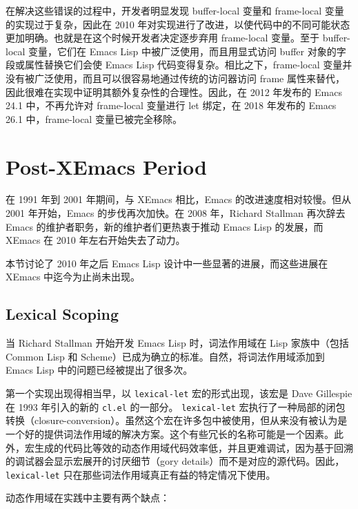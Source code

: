 \documentclass[format=acmsmall,screen]{acmart}
\begin{document}
在解决这些错误的过程中，开发者明显发现 buffer-local 变量和 frame-local 变量的实现过于复杂，因此在 2010 年对实现进行了改进，以使代码中的不同可能状态更加明确。也就是在这个时候开发者决定逐步弃用 frame-local 变量。至于 buffer-local 变量，它们在 Emacs Lisp 中被广泛使用，而且用显式访问 buffer 对象的字段或属性替换它们会使 Emacs Lisp 代码变得复杂。相比之下，frame-local 变量并没有被广泛使用，而且可以很容易地通过传统的访问器访问 frame 属性来替代，因此很难在实现中证明其额外复杂性的合理性。因此，在 2012 年发布的 Emacs 24.1 中，不再允许对 frame-local 变量进行 let 绑定，在 2018 年发布的 Emacs 26.1 中，frame-local 变量已被完全移除。

\section{Post-XEmacs Period}           %
\label{sec:post-xemacs}

在 1991 年到 2001 年期间，与 XEmacs 相比，Emacs 的改进速度相对较慢。但从 2001 年开始，Emacs 的步伐再次加快。在 2008 年，Richard Stallman 再次辞去 Emacs 的维护者职务，新的维护者们更热衷于推动 Emacs Lisp 的发展，而 XEmacs 在 2010 年左右开始失去了动力。


本节讨论了 2010 年之后 Emacs Lisp 设计中一些显著的进展，而这些进展在 XEmacs 中迄今为止尚未出现。

\subsection{Lexical Scoping}
\label{sec:lexical-scoping}

当 Richard Stallman 开始开发 Emacs Lisp 时，词法作用域在 Lisp 家族中（包括 Common Lisp 和 Scheme）已成为确立的标准。自然，将词法作用域添加到 Emacs Lisp 中的问题已经被提出了很多次。

第一个实现出现得相当早，以 \texttt{lexical-let} 宏的形式出现，该宏是 Dave Gillespie 在 1993 年引入的新的 \texttt{cl.el} 的一部分。 \texttt{lexical-let} 宏执行了一种局部的闭包转换（closure-conversion）。虽然这个宏在许多包中被使用，但从来没有被认为是一个好的提供词法作用域的解决方案。这个有些冗长的名称可能是一个因素。此外，宏生成的代码比等效的动态作用域代码效率低，并且更难调试，因为基于回溯的调试器会显示宏展开的讨厌细节（gory details）而不是对应的源代码。因此，\texttt{lexical-let} 只在那些词法作用域真正有益的特定情况下使用。

动态作用域在实践中主要有两个缺点：
\end{document}
